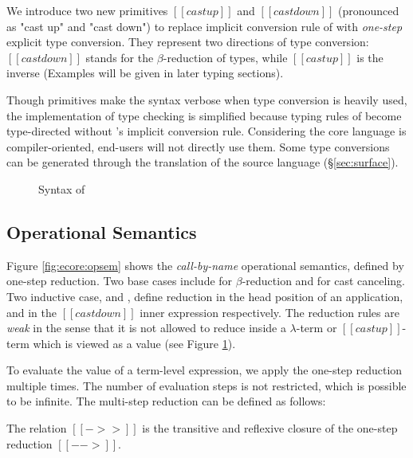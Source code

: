 We introduce two new primitives $[[castup]]$ and $[[castdown]]$
(pronounced as "cast up" and "cast down") to replace implicit
conversion rule of \cc with \emph{one-step} explicit type
conversion. They represent two directions of type conversion:
$[[castdown]]$ stands for the $\beta$-reduction of types, while
$[[castup]]$ is the inverse (Examples will be given in later typing sections).

Though \cast primitives make the syntax verbose when type conversion
is heavily used, the implementation of type checking is simplified
because typing rules of \ecore become type-directed without \cc's
implicit conversion rule. Considering the core language is
compiler-oriented, end-users will not directly use them. Some type
conversions can be generated through the translation of the source
language (\S \ref{sec:surface}).

\begin{figure}
    \gram{\ottec\ottinterrule
        \ottG\ottinterrule
        \ottv}
    \caption{Syntax of \ecore}
    \label{fig:ecore:syntax}
\end{figure}

\subsection{Operational Semantics}\label{sec:ecore:opsem}

Figure \ref{fig:ecore:opsem} shows the \emph{call-by-name} operational
semantics, defined by one-step reduction. Two base cases include
 for $\beta$-reduction and 
for cast canceling. Two inductive case,  and
, define reduction in the head position of an
application, and in the $[[castdown]]$ inner expression
respectively. The reduction rules are \emph{weak} in the sense that it
is not allowed to reduce inside a $\lambda$-term or $[[castup]]$-term
which is viewed as a value (see Figure \ref{fig:ecore:syntax}).

To evaluate the value of a term-level expression, we apply the
one-step reduction multiple times. The number of evaluation steps is
not restricted, which is possible to be infinite. The multi-step
reduction can be defined as follows:

\begin{dfn}
    The relation $[[->>]]$ is the transitive and reflexive closure of
    the one-step reduction $[[-->]]$.
\end{dfn}

